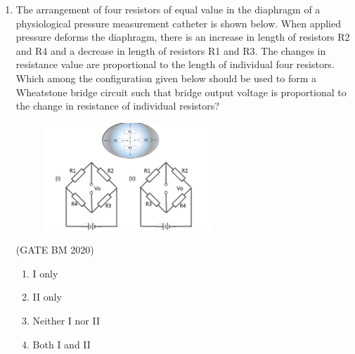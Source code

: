 \documentclass[journal]{IEEEtran}
\begin{document}
\begin{enumerate}
\begin{itemize}
    \item[] (Gas constant $= 8.315$ J/mol/K, core temperature $= 37^\circ$C and
    \item[] Faraday constant $= 96500$ C/mol)
\end{itemize}


\hfill(GATE BM 2020)
\begin{multicols}{4}
\begin{enumerate}
    \item $-117.7$ mV
    \item $-18.77$ mV
    \item $-53.32$ mV
    \item $-141.20$ mV
\end{enumerate}
\end{multicols}

\item  The arrangement of four resistors of equal value in the diaphragm of a physiological pressure measurement catheter is shown below. When applied pressure deforms the diaphragm, there is an increase in length of resistors R2 and R4 and a decrease in length of resistors R1 and R3. The changes in resistance value are proportional to the length of individual four resistors. Which among the configuration given below should be used to form a Wheatstone bridge circuit such that bridge output voltage is proportional to the change in resistance of individual resistors?


    \begin{figure}[H]
    \centering
\includegraphics[width=0.6\textwidth]{Screenshot_2025_0822_155841.png}
\caption{}
    \label{fig:Q37}
\end{figure}

\hfill(GATE BM 2020)
\begin{multicols}{2}
\begin{enumerate}
    \item I only
    \item II only
    \item Neither I nor II
    \item Both I and II
\end{enumerate}
\end{multicols}


\end{enumerate}
\end{document}
